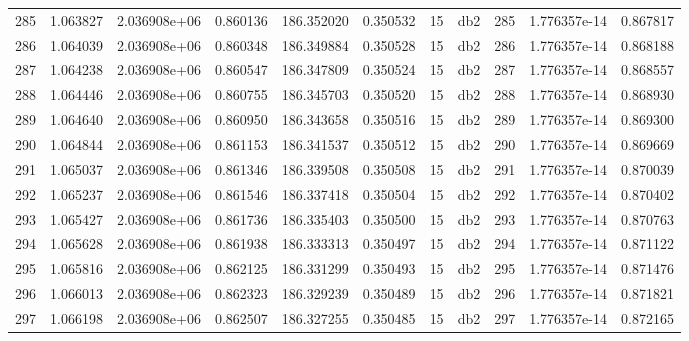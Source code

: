 \begin{tabular}{lrrrrrrlrrr}
285  &    1.063827 &        2.036908e+06 &  0.860136 &              186.352020 &    0.350532 &      15 &          db2 &    285 &   1.776357e-14 &      0.867817 \\
286  &    1.064039 &        2.036908e+06 &  0.860348 &              186.349884 &    0.350528 &      15 &          db2 &    286 &   1.776357e-14 &      0.868188 \\
287  &    1.064238 &        2.036908e+06 &  0.860547 &              186.347809 &    0.350524 &      15 &          db2 &    287 &   1.776357e-14 &      0.868557 \\
288  &    1.064446 &        2.036908e+06 &  0.860755 &              186.345703 &    0.350520 &      15 &          db2 &    288 &   1.776357e-14 &      0.868930 \\
289  &    1.064640 &        2.036908e+06 &  0.860950 &              186.343658 &    0.350516 &      15 &          db2 &    289 &   1.776357e-14 &      0.869300 \\
290  &    1.064844 &        2.036908e+06 &  0.861153 &              186.341537 &    0.350512 &      15 &          db2 &    290 &   1.776357e-14 &      0.869669 \\
291  &    1.065037 &        2.036908e+06 &  0.861346 &              186.339508 &    0.350508 &      15 &          db2 &    291 &   1.776357e-14 &      0.870039 \\
292  &    1.065237 &        2.036908e+06 &  0.861546 &              186.337418 &    0.350504 &      15 &          db2 &    292 &   1.776357e-14 &      0.870402 \\
293  &    1.065427 &        2.036908e+06 &  0.861736 &              186.335403 &    0.350500 &      15 &          db2 &    293 &   1.776357e-14 &      0.870763 \\
294  &    1.065628 &        2.036908e+06 &  0.861938 &              186.333313 &    0.350497 &      15 &          db2 &    294 &   1.776357e-14 &      0.871122 \\
295  &    1.065816 &        2.036908e+06 &  0.862125 &              186.331299 &    0.350493 &      15 &          db2 &    295 &   1.776357e-14 &      0.871476 \\
296  &    1.066013 &        2.036908e+06 &  0.862323 &              186.329239 &    0.350489 &      15 &          db2 &    296 &   1.776357e-14 &      0.871821 \\
297  &    1.066198 &        2.036908e+06 &  0.862507 &              186.327255 &    0.350485 &      15 &          db2 &    297 &   1.776357e-14 &      0.872165 \\

\end{tabular}
